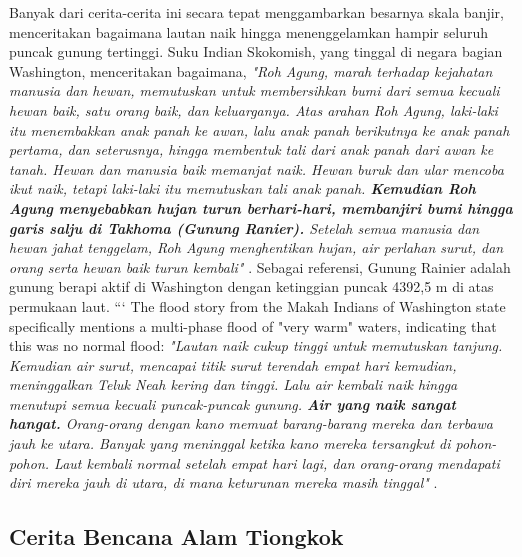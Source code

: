 \documentclass[10pt,twocolumn,letterpaper]{article}
\begin{document}
Banyak dari cerita-cerita ini secara tepat menggambarkan besarnya skala banjir, menceritakan bagaimana lautan naik hingga menenggelamkan hampir seluruh puncak gunung tertinggi. Suku Indian Skokomish, yang tinggal di negara bagian Washington, menceritakan bagaimana, \textit{"Roh Agung, marah terhadap kejahatan manusia dan hewan, memutuskan untuk membersihkan bumi dari semua kecuali hewan baik, satu orang baik, dan keluarganya. Atas arahan Roh Agung, laki-laki itu menembakkan anak panah ke awan, lalu anak panah berikutnya ke anak panah pertama, dan seterusnya, hingga membentuk tali dari anak panah dari awan ke tanah. Hewan dan manusia baik memanjat naik. Hewan buruk dan ular mencoba ikut naik, tetapi laki-laki itu memutuskan tali anak panah. \textbf{Kemudian Roh Agung menyebabkan hujan turun berhari-hari, membanjiri bumi hingga garis salju di Takhoma (Gunung Ranier).} Setelah semua manusia dan hewan jahat tenggelam, Roh Agung menghentikan hujan, air perlahan surut, dan orang serta hewan baik turun kembali"} \cite{3}. Sebagai referensi, Gunung Rainier adalah gunung berapi aktif di Washington dengan ketinggian puncak 4392,5 m di atas permukaan laut.
```
The flood story from the Makah Indians of Washington state specifically mentions a multi-phase flood of "very warm" waters, indicating that this was no normal flood: \textit{"Lautan naik cukup tinggi untuk memutuskan tanjung. Kemudian air surut, mencapai titik surut terendah empat hari kemudian, meninggalkan Teluk Neah kering dan tinggi. Lalu air kembali naik hingga menutupi semua kecuali puncak-puncak gunung. \textbf{Air yang naik sangat hangat.} Orang-orang dengan kano memuat barang-barang mereka dan terbawa jauh ke utara. Banyak yang meninggal ketika kano mereka tersangkut di pohon-pohon. Laut kembali normal setelah empat hari lagi, dan orang-orang mendapati diri mereka jauh di utara, di mana keturunan mereka masih tinggal"} \cite{3}.

\subsection{Cerita Bencana Alam Tiongkok}
\end{document}
